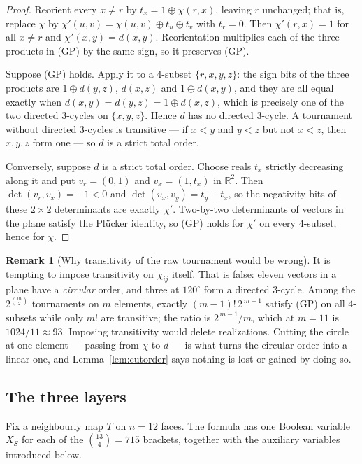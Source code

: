 \documentclass[11pt,reqno]{amsart}
\theoremstyle{plain}
\theoremstyle{definition}
\newtheorem{remark}[theorem]{Remark}
\newcommand{\RR}{\mathbb{R}}
\newcommand{\xor}{\oplus}
\DeclareMathOperator{\dett}{det}
\begin{document}
\begin{proof}
Reorient every $x\ne r$ by $t_x=1\xor\chi(r,x)$, leaving $r$ unchanged; that is, replace $\chi$ by
$\chi'(u,v)=\chi(u,v)\xor t_u\xor t_v$ with $t_r=0$. Then $\chi'(r,x)=1$ for all $x\ne r$ and
$\chi'(x,y)=d(x,y)$. Reorientation multiplies each of the three products in (GP) by the same sign, so
it preserves (GP).

Suppose (GP) holds. Apply it to a $4$-subset $\{r,x,y,z\}$: the sign bits of the three products are
$1\xor d(y,z)$, $d(x,z)$ and $1\xor d(x,y)$, and they are all equal exactly when
$d(x,y)=d(y,z)=1\xor d(x,z)$, which is precisely one of the two directed $3$-cycles on $\{x,y,z\}$.
Hence $d$ has no directed $3$-cycle. A tournament without directed $3$-cycles is transitive --- if
$x<y$ and $y<z$ but not $x<z$, then $x,y,z$ form one --- so $d$ is a strict total order.

Conversely, suppose $d$ is a strict total order. Choose reals $t_x$ strictly decreasing along it and
put $v_r=(0,1)$ and $v_x=(1,t_x)$ in $\RR^2$. Then $\dett(v_r,v_x)=-1<0$ and
$\dett(v_x,v_y)=t_y-t_x$, so the negativity bits of these $2\times2$ determinants are exactly
$\chi'$. Two-by-two determinants of vectors in the plane satisfy the Plücker identity, so (GP) holds
for $\chi'$ on every $4$-subset, hence for $\chi$.
\end{proof}

\begin{remark}[Why transitivity of the raw tournament would be wrong]\label{rem:counts}
It is tempting to impose transitivity on $\chi_{ij}$ itself. That is false: eleven vectors in a plane
have a \emph{circular} order, and three at $120^{\circ}$ form a directed $3$-cycle. Among the
$2^{\binom{m}{2}}$ tournaments on $m$ elements, exactly $(m-1)!\,2^{\,m-1}$ satisfy (GP) on all
$4$-subsets while only $m!$ are transitive; the ratio is $2^{\,m-1}/m$, which at $m=11$ is
$1024/11\approx93$. Imposing transitivity would delete realizations. Cutting the circle at one element
--- passing from $\chi$ to $d$ --- is what turns the circular order into a linear one, and
Lemma~\ref{lem:cutorder} says nothing is lost or gained by doing so.
\end{remark}

\subsection{The three layers}
Fix a neighbourly map $T$ on $n=12$ faces. The formula has one Boolean variable $X_S$ for each of the
$\binom{13}{4}=715$ brackets, together with the auxiliary variables introduced below.
\end{document}

